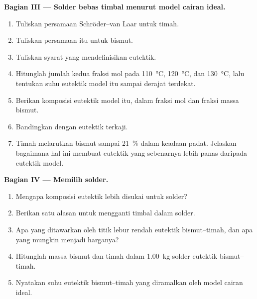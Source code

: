\begin{problem}
\medskip
\noindent\textbf{Bagian III --- Solder bebas timbal menurut model cairan ideal.}
\begin{enumerate}[resume]
  \item Tuliskan persamaan Schröder--van Laar untuk  timah.
  \item Tuliskan persamaan itu untuk  bismut.
  \item Tuliskan syarat yang mendefinisikan eutektik.
  \item Hitunglah jumlah kedua fraksi mol pada \qty{110}{\degreeCelsius},
        \qty{120}{\degreeCelsius}, dan \qty{130}{\degreeCelsius}, lalu
        tentukan suhu eutektik model itu sampai derajat terdekat.
  \item Berikan komposisi eutektik model itu, dalam fraksi mol dan fraksi
        massa bismut.
  \item Bandingkan dengan eutektik terkaji.
  \item Timah melarutkan bismut sampai 21~\% dalam keadaan padat. Jelaskan
        bagaimana hal ini membuat eutektik yang sebenarnya lebih panas
        daripada eutektik model.
\end{enumerate}

\medskip
\noindent\textbf{Bagian IV --- Memilih solder.}
\begin{enumerate}[resume]
  \item Mengapa komposisi eutektik lebih disukai untuk solder?
  \item Berikan satu alasan untuk mengganti timbal dalam solder.
  \item Apa yang ditawarkan oleh titik lebur rendah eutektik bismut--timah,
        dan apa yang mungkin menjadi harganya?
  \item Hitunglah massa bismut dan timah dalam \qty{1.00}{kg} solder
        eutektik bismut--timah.
  \item Nyatakan suhu eutektik bismut--timah yang diramalkan oleh model
        cairan ideal.
\end{enumerate}
\end{problem}
